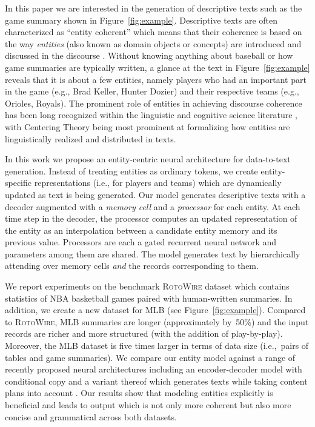 \documentclass[11pt,a4paper]{article}
\begin{document}
In this paper we are interested in the generation of descriptive texts
such as the game summary shown in
Figure~\ref{fig:example}. Descriptive texts are often characterized as
``entity coherent'' which means that their coherence is based on the
way \emph{entities} (also known as domain objects or concepts) are
introduced and discussed in the discourse
\cite{P04-1050}. Without knowing anything about baseball or how
game summaries are typically written, a glance at the text in
Figure~\ref{fig:example} reveals that it is about a few entities,
namely players who had an important part in the game (e.g., Brad
Keller, Hunter Dozier) and their respective teams (e.g., Orioles,
Royals). The prominent role of entities in achieving discourse
coherence has been long recognized within the linguistic and cognitive
science literature
\cite{Kuno:1972a,Chafe:1976a,Halliday:Hasan:76,Karttunen:1976a,Clark:Haviland:1977a,Prince:1981a},
with Centering Theory \cite{DBLP:journals/coling/GroszJW95} being most prominent
at formalizing how entities are linguistically realized and
distributed in texts.



In this work we propose an entity-centric neural architecture for
data-to-text generation. Instead of treating entities as ordinary
tokens, we create entity-specific representations (i.e., for players
and teams) which are dynamically updated as text is being generated.
Our model generates descriptive texts with a decoder augmented with a
\emph{memory cell} and a \emph{processor} for each entity.
At each time step in the decoder, the processor computes an updated
representation of the entity as an interpolation between a candidate
entity memory and its previous value. Processors are each a gated
recurrent neural network and parameters among them are shared.  The
model generates text by hierarchically attending over memory cells
\emph{and} the records corresponding to them.

We report experiments on the benchmark \textsc{RotoWire} dataset
\cite{D17-1239} which contains statistics of NBA basketball games
paired with human-written summaries. In addition, we create a new
dataset for MLB (see Figure~\ref{fig:example}).  Compared to
\textsc{RotoWire}, MLB summaries are longer (approximately by~50\%)
and the input records are richer and more structured (with the
addition of play-by-play). Moreover, the MLB dataset is five times
larger in terms of data size (i.e.,~pairs of tables and game
summaries). We compare our entity model against a range of recently
proposed neural architectures including an encoder-decoder model with
conditional copy \cite{D17-1239} and a variant thereof which generates
texts while taking content plans into account
\cite{DBLP:journals/corr/abs-1809-00582}. Our results show that
modeling entities explicitly is beneficial and leads to output which
is not only more coherent but also more concise and grammatical across
both datasets.
\end{document}
